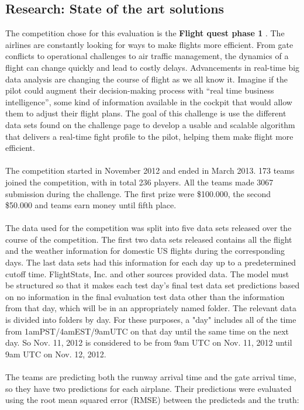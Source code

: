 \documentclass{vldb}
\begin{document}
	\subsection{Research: State of the art solutions}
		The competition chose for this evaluation is the \textbf{Flight quest phase 1} \cite{first} . The airlines are constantly looking for ways to make flights more efficient. From gate conflicts to operational challenges to air traffic management, the dynamics of a flight can change quickly and lead to costly delays. Advancements in real-time big data analysis are changing the course of flight as we all know it. Imagine if the pilot could augment their decision-making process with ``real time business intelligence'', some kind of information available in the cockpit that would allow them to adjust their flight plans. The goal of this challenge is use the different data sets found on the challenge page to develop a usable and scalable algorithm that delivers a real-time fight profile to the pilot, helping them make flight more efficient.\\\\
		The competition started in November 2012 and ended in March 2013. 173 teams joined the competition, with in total 236 players. All the teams made 3067 submission during the challenge. The first prize were \$100.000, the second \$50.000 and teams earn money until fifth place.\\\\
		The data used for the competition was split into five data sets released over the course of the competition. The first two data sets released contains all the flight and the weather information for domestic US flights during the corresponding days. The last data sets had this information for each day up to a predetermined cutoff time. FlightStats, Inc. and other sources provided data. The model must be structured so that it makes each test day's final test data set predictions based on no information in the final evaluation test data other than the information from that day, which will be in an appropriately named folder. The relevant data is divided into folders by day. For these purposes, a "day" includes all of the time from 1amPST/4amEST/9amUTC on that day until the same time on the next day. So Nov. 11, 2012 is considered to be from 9am UTC on Nov. 11, 2012 until 9am UTC on Nov. 12, 2012.\\\\
		The teams are predicting both the runway arrival time and the gate arrival time, so they have two predictions for each airplane. Their predictions were evaluated using the root mean squared error (RMSE) between the predicteds and the truth:\\
\end{document}
